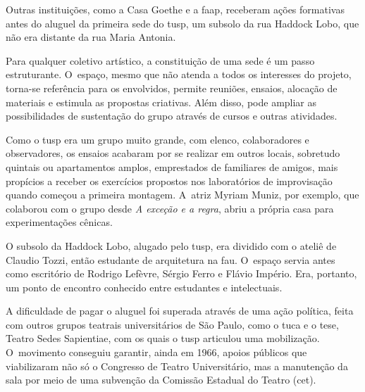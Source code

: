 Outras instituições, como a Casa Goethe e a {\sc faap}, receberam ações
formativas antes do aluguel da primeira sede do {\sc tusp}, um subsolo da rua
Haddock Lobo, que não era distante da rua Maria Antonia.

Para qualquer coletivo artístico, a constituição de uma sede é um passo
estruturante. O~espaço, mesmo que não atenda a todos os interesses do
projeto, torna-se referência para os envolvidos, permite reuniões,
ensaios, alocação de materiais e estimula as propostas criativas. Além
disso, pode ampliar as possibilidades de sustentação do grupo através de
cursos e outras atividades.

Como o {\sc tusp} era um grupo muito grande, com elenco, colaboradores e
observadores, os ensaios acabaram por se realizar em outros locais,
sobretudo quintais ou apartamentos amplos, emprestados de familiares de
amigos, mais propícios a receber os exercícios propostos nos
laboratórios de improvisação quando começou a primeira montagem. A~atriz
Myriam Muniz, por exemplo, que colaborou com o grupo desde {\it A
exceção e a regra}, abriu a própria casa para experimentações cênicas.

O subsolo da Haddock Lobo, alugado pelo {\sc tusp}, era dividido com o ateliê
de Claudio Tozzi, então estudante de arquitetura na {\sc fau}. O~espaço servia
antes como escritório de Rodrigo Lefèvre, Sérgio Ferro e Flávio
Império. Era, portanto, um ponto de encontro conhecido entre estudantes
e intelectuais.


A dificuldade de pagar o aluguel foi superada através de uma ação
política, feita com outros grupos teatrais universitários de São Paulo,
como o {\sc tuca} e o {\sc tese}, Teatro Sedes Sapientiae, com os quais o {\sc tusp}
articulou uma mobilização. O~movimento conseguiu garantir, ainda em
1966, apoios públicos que viabilizaram não só o Congresso de Teatro
Universitário, mas a manutenção da sala por meio de uma subvenção da
Comissão Estadual do Teatro ({\sc cet}).

